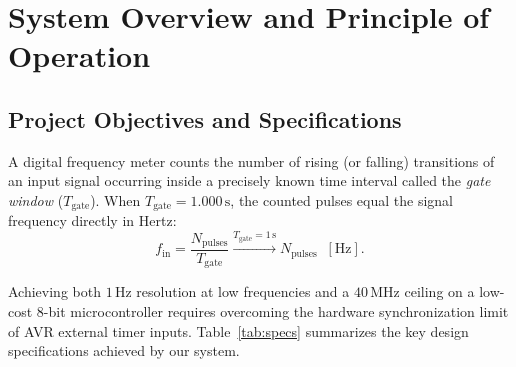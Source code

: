 \documentclass[11pt,a4paper]{article}
\begin{document}
\vspace{0.5cm}
\tableofcontents
\newpage
\listoffigures
\listoftables
\newpage

\section{System Overview and Principle of Operation}

\subsection{Project Objectives and Specifications}
A digital frequency meter counts the number of rising (or falling) transitions of an input signal occurring inside a precisely known time interval called the \emph{gate window} ($T_{\text{gate}}$). When $T_{\text{gate}} = 1.000\,\text{s}$, the counted pulses equal the signal frequency directly in Hertz:
\begin{equation}
    f_{\text{in}} = \frac{N_{\text{pulses}}}{T_{\text{gate}}} \xrightarrow{T_{\text{gate}} = 1\,\text{s}} N_{\text{pulses}} \;\; [\text{Hz}].
\end{equation}

Achieving both $1\,\text{Hz}$ resolution at low frequencies and a $40\,\text{MHz}$ ceiling on a low-cost 8-bit microcontroller requires overcoming the hardware synchronization limit of AVR external timer inputs. Table~\ref{tab:specs} summarizes the key design specifications achieved by our system.
\end{document}
